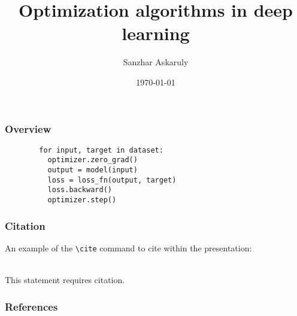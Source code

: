 \documentclass{beamer}
\title[CodeSeoul] %
	{Optimization algorithms in deep learning}
\author[AI Research Paper Review] %
	{Sanzhar Askaruly}
\institute[] %
	{ Ulsan National Institute of Science and Technology\newline
	  Ph.D. Candidate in Biomedical Engineering}
\date{\today}
\begin{document}
    \begin{frame}
    \titlepage %
    \end{frame}

    \begin{frame}
    \frametitle{Overview} %
    \tableofcontents 
    \end{frame}

    \begin{frame}[fragile]
    \begin{lstlisting}
        for input, target in dataset:
          optimizer.zero_grad()
          output = model(input)
          loss = loss_fn(output, target)
          loss.backward()
          optimizer.step()
    \end{lstlisting}
    \end{frame}

    \begin{frame}[fragile] %
    \frametitle{Citation}
    An example of the \verb|\cite| command to cite within the presentation:\\~
    
    This statement requires citation.~\cite{test1} 
    \end{frame}


    \begin{frame}[t, allowframebreaks]
    \frametitle{References}
    
    
    \end{frame}
\end{document}
